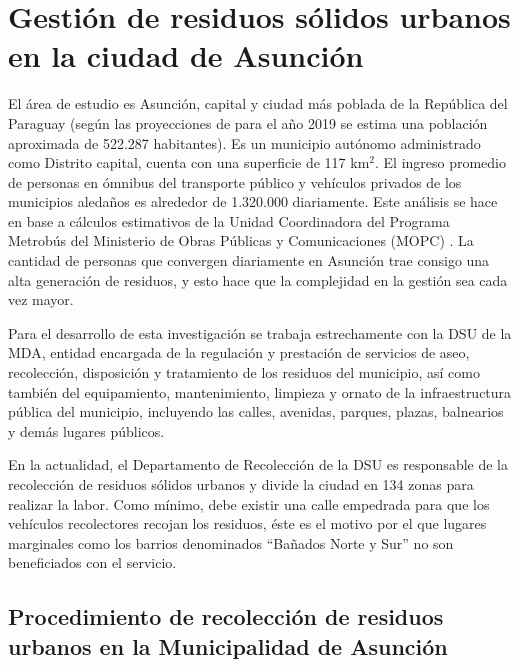 \section{Gestión de residuos sólidos urbanos en la ciudad de Asunción}

El área de estudio es Asunción, capital y ciudad más poblada de la República del Paraguay (según las proyecciones de \citet*{DireccionGeneraldeEstadistica2015Paraguay2000-2025} para el año 2019 se estima una población aproximada de 522.287 habitantes). Es un municipio autónomo administrado como Distrito capital, cuenta con una superficie de 117 km$^{2}$. El ingreso promedio de personas en ómnibus del transporte público y vehículos privados de los municipios aledaños es alrededor de 1.320.000 diariamente. Este análisis se hace en base a cálculos estimativos de la Unidad Coordinadora del Programa Metrobús del Ministerio de Obras Públicas y Comunicaciones (MOPC) \citep{DiarioABCColor2016PorColor}. La cantidad de personas que convergen diariamente en Asunción trae consigo una alta generación de residuos, y esto hace que la complejidad en la gestión sea cada vez mayor.

Para el desarrollo de esta investigación se trabaja estrechamente con la DSU de la MDA, entidad encargada de la regulación y prestación de servicios de aseo, recolección, disposición y tratamiento de los residuos del municipio, así como también del equipamiento, mantenimiento, limpieza y ornato de la infraestructura pública del municipio, incluyendo las calles, avenidas, parques, plazas, balnearios y demás lugares públicos.


En la actualidad, el Departamento de Recolección de la DSU es responsable de la recolección de residuos sólidos urbanos y divide la ciudad en 134 zonas para realizar la labor. Como mínimo, debe existir una calle empedrada para que los vehículos recolectores recojan los residuos, éste es el motivo por el que lugares marginales como los barrios denominados ``Bañados Norte y Sur'' no son beneficiados con el servicio.


\subsection{Procedimiento de recolección de residuos urbanos en la Municipalidad de Asunción}

